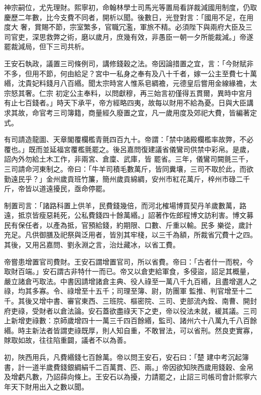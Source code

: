 \begin{pinyinscope}
 神宗嗣位，尤先理財。熙寧初，命翰林學士司馬光等置局看詳裁減國用制度，仍取慶歷二年數，比今支費不同者，開析以聞。後數日，光登對言：「國用不足，在用度大
 奢，賞賜不節，宗室繁多，官職冗濫，軍旅不精。必須陛下與兩府大臣及三司官吏，深思救弊之術，磨以歲月，庶幾有效，非愚臣一朝一夕所能裁減。」帝遂罷裁減局，但下三司共析。



 王安石執政，議置三司條例司，講修錢穀之法。帝因論措置之宜，言：「今財賦非不多，但用不節，何由給足？宮中一私身之奉有及八十千者，嫁一公主至費七十萬緡，沈貴妃料錢月八百緡。聞太宗時宮人惟系皂綢襜，元德皇后嘗用金線緣襜，太宗怒其奢。仁宗
 初定公主奉料，以問獻穆，再三始言初僅得五貫爾，異時中宮月有止七百錢者。」時天下承平，帝方經略四夷，故每以財用不給為憂。日與大臣講求其故，命官考三司簿籍，商量經久廢置之宜，凡一歲用度及郊祀大費，皆編著定式。



 有司請造龍圖、天章閣覆欄檻青氈四百九十。帝謂：「禁中諸殿欄檻率故弊，不必覆也。」既而並延福宮覆檻氈罷之。後呂嘉問復建議省儀鸞司供禁中彩帛。是歲，詔內外勿給土木工作，非兩宮、倉廩、武庫，皆
 罷省。三年，儀鸞司闕氈三千，三司請命河東制之。帝曰：「牛羊司積毛數萬斤，皆同糞壤，三司不取於此，而欲勤遠民乎？」金州歲貢班竹簾，簡州歲貢綿綢，安州市紅花萬斤，梓州市碌二千斤，帝皆以道遠擾民，亟命停罷。



 制置司言：「諸路科置上供羊，民費錢幾倍，而河北榷場博買契丹羊歲數萬，路遠，抵京皆瘦惡耗死，公私費錢四十餘萬緡。」詔著作佐郎程博文訪利害。博文募民有保任者，以產為抵，官預給錢，約期限、口數、斤重以輸。民多
 樂從，歲計充足。凡供御膳及祀祭與泛用者，皆別其牢棧，以三千為額，所裁省冗費十之四。其後，又用呂嘉問、劉永淵之言，治灶藏冰，以省工費。



 帝嘗患增置官司費財。王安石謂增置官司，所以省費。帝曰：「古者什一而稅，今取財百端。」安石謂古非特什一而已。帝又以倉吏給軍食，多侵盜，詔足其概量，嚴立諸倉丐取法。中書因請增諸倉主典、役人祿至一萬八千九百緡，且盡增選人之祿，均其多寡。令、祿增至十五千；司理至簿、尉，防團軍
 監推、判官增至十二千。其後又增中書、審官東西、三班院、樞密院、三司、吏部流內銓、南曹、開封府吏祿，受財者以倉法論。安石蓋欲盡祿天下之吏，帝以役法未就，緩其議。三司上新增吏祿數：京師歲增四十一萬三千四百餘緡，監司、諸州六十八萬九千八百餘緡。時主新法者皆謂吏祿既厚，則人知自重，不敢冒法，可以省刑。然良吏實寡，賕取如故，往往陷重闢，議者不以為善。



 初，陜西用兵，凡費緡錢七百餘萬。帝以問王安石，安石曰：「楚
 建中考沉起簿書，計一道半歲費錢銀綢絹千二百萬貫、匹、兩。」帝因欲知陜西歲用錢穀、金帛及增虧凡數，乃詔薛向條上。王安石以為擾，力請罷之，止詔三司帳司會計熙寧六年天下財用出入之數以聞。




\end{pinyinscope}
